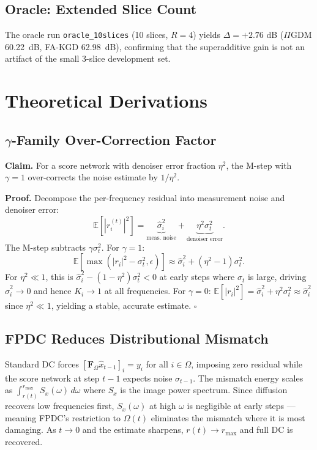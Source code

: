 \documentclass[conference]{IEEEtran}
\newcommand{\hatsig}{\hat{\sigma}}
\newcommand{\PIGDM}{$\Pi$GDM}
\begin{document}
\subsection{Oracle: Extended Slice Count}

The oracle run \texttt{oracle\_10slices} (10 slices, $R=4$) yields
$\Delta = +2.76$ dB (\PIGDM{} 60.22~dB, FA-KGD 62.98~dB), confirming that
the superadditive gain is not an artifact of the small 3-slice development
set.

\section{Theoretical Derivations}
\label{app:theory}

\subsection{$\gamma$-Family Over-Correction Factor}

\textbf{Claim.} For a score network with denoiser error fraction $\eta^2$,
the M-step with $\gamma = 1$ over-corrects the noise estimate by $1/\eta^2$.

\textbf{Proof.} Decompose the per-frequency residual into measurement noise
and denoiser error:
\[
  \mathbb{E}[|r_i^{(t)}|^2] = \underbrace{\hatsig_i^2}_{\text{meas. noise}}
  + \underbrace{\eta^2 \sigma_t^2}_{\text{denoiser error}}.
\]
The M-step subtracts $\gamma\sigma_t^2$. For $\gamma = 1$:
\[
  \mathbb{E}[\max(|r_i|^2 - \sigma_t^2, \epsilon)]
  \approx \hatsig_i^2 + (\eta^2 - 1)\sigma_t^2.
\]
For $\eta^2 \ll 1$, this is $\hatsig_i^2 - (1-\eta^2)\sigma_t^2 < 0$ at
early steps where $\sigma_t$ is large, driving $\hatsig_i^2 \rightarrow 0$
and hence $K_i \rightarrow 1$ at all frequencies. For $\gamma = 0$:
$\mathbb{E}[|r_i|^2] = \hatsig_i^2 + \eta^2\sigma_t^2 \approx \hatsig_i^2$
since $\eta^2 \ll 1$, yielding a stable, accurate estimate. \hfill $\square$

\subsection{FPDC Reduces Distributional Mismatch}

Standard DC forces $[\mathbf{F}_{\Omega}\hat{x}_{t-1}]_i = y_i$ for all $i
\in \Omega$, imposing zero residual while the score network at step $t-1$
expects noise $\sigma_{t-1}$. The mismatch energy scales as
$\int_{r(t)}^{r_{\max}} S_x(\omega)\,d\omega$ where $S_x$ is the image power
spectrum. Since diffusion recovers low frequencies first, $S_x(\omega)$ at
high $\omega$ is negligible at early steps — meaning FPDC's restriction to
$\Omega(t)$ eliminates the mismatch where it is most damaging. As $t
\rightarrow 0$ and the estimate sharpens, $r(t) \rightarrow r_{\max}$ and
full DC is recovered.
\end{document}

